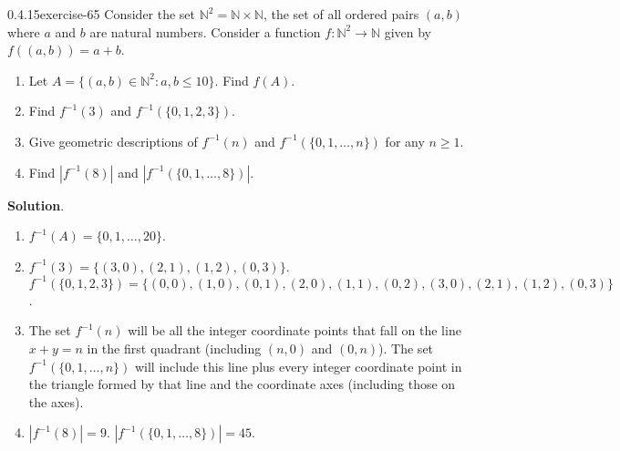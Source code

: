 \documentclass[twoside,11pt,]{book}
\numberwithin{equation}{chapter}
\newcommand{\N}{\mathbb N}
\newcommand{\inv}{^{-1}}
\newcommand{\st}{:}
\newcommand{\card}[1]{\left| #1 \right|}
\begin{document}
\begin{divisionsolution}{0.4.15}{}{exercise-65}%
\hypertarget{p-1088}{}%
Consider the set \(\N^2 = \N \times \N\), the set of all ordered pairs \((a,b)\) where \(a\) and \(b\) are natural numbers. Consider a function \(f: \N^2 \to \N\) given by \(f((a,b)) =a+b\).\leavevmode%
\begin{enumerate}[label=(\alph*)]
\item\hypertarget{li-877}{}\hypertarget{p-1089}{}%
Let \(A = \{(a,b) \in \N^2 \st a, b \le 10\}\). Find \(f(A)\).%
\item\hypertarget{li-878}{}\hypertarget{p-1090}{}%
Find \(f\inv(3)\) and \(f\inv(\{0,1,2,3\})\).%
\item\hypertarget{li-879}{}\hypertarget{p-1091}{}%
Give geometric descriptions of \(f\inv(n)\) and \(f\inv(\{0, 1, \ldots, n\})\) for any \(n \ge 1\).%
\item\hypertarget{li-880}{}\hypertarget{p-1092}{}%
Find \(\card{f\inv(8)}\) and \(\card{f\inv(\{0,1, \ldots, 8\})}\).%
\end{enumerate}
%
\par\smallskip%
\noindent\textbf{Solution}.\quad%
\hypertarget{p-1093}{}%
\leavevmode%
\begin{enumerate}[label=(\alph*)]
\item\hypertarget{li-881}{}\hypertarget{p-1094}{}%
\(f\inv(A) = \{0, 1, \ldots, 20\}\).%
\item\hypertarget{li-882}{}\hypertarget{p-1095}{}%
\(f\inv(3) = \{(3,0), (2,1), (1,2), (0,3)\}\). \(f\inv(\{0,1,2,3\}) = \{(0,0), (1,0), (0,1), (2, 0), (1,1), (0, 2), (3,0), (2,1), (1,2), (0,3)\}\).%
\item\hypertarget{li-883}{}\hypertarget{p-1096}{}%
The set \(f\inv(n)\) will be all the integer coordinate points that fall on the line \(x+y = n\) in the first quadrant (including \((n,0)\) and \((0,n)\)). The set \(f\inv(\{0, 1, \ldots,
n\})\) will include this line plus every integer coordinate point in the triangle formed by that line and the coordinate axes (including those on the axes).%
\item\hypertarget{li-884}{}\hypertarget{p-1097}{}%
\(\card{f\inv(8)} = 9\). \(\card{f\inv(\{0, 1, \ldots, 8\})} = 45\).%
\end{enumerate}
%
\end{divisionsolution}%
\end{document}

